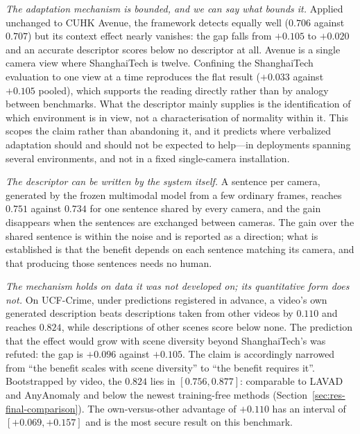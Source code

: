 \documentclass[a4paper,fleqn]{cas-sc}
\begin{document}
\emph{The adaptation mechanism is bounded, and we can say what bounds it.}
Applied unchanged to CUHK Avenue, the framework detects equally well ($0.706$
against $0.707$) but its context effect nearly vanishes: the gap falls from
$+0.105$ to $+0.020$ and an accurate descriptor scores below no descriptor at
all. Avenue is a single camera view where ShanghaiTech is twelve. Confining
the ShanghaiTech evaluation to one view at a time reproduces the flat result
($+0.033$ against $+0.105$ pooled), which supports the reading directly rather
than by analogy between benchmarks. What the descriptor mainly supplies is the
identification of which environment is in view, not a characterisation of
normality within it. This scopes the claim rather than abandoning it, and it
predicts where verbalized adaptation should and should not be expected to
help---in deployments spanning several environments, and not in a fixed
single-camera installation.

\emph{The descriptor can be written by the system itself.} A sentence per camera,
generated by the frozen multimodal model from a few ordinary frames, reaches
$0.751$ against $0.734$ for one sentence shared by every camera, and the gain
disappears when the sentences are exchanged between cameras. The gain over the
shared sentence is within the noise and is reported as a direction; what is
established is that the benefit depends on each sentence matching its camera,
and that producing those sentences needs no human.

\emph{The mechanism holds on data it was not developed on; its quantitative
form does not.} On UCF-Crime, under predictions registered in advance, a
video's own generated description beats descriptions taken from other videos by
$0.110$ and reaches $0.824$, while descriptions of other scenes score below none.
The prediction that the effect would grow with scene diversity beyond
ShanghaiTech's was refuted: the gap is $+0.096$ against $+0.105$. The claim is
accordingly narrowed from ``the benefit scales with scene diversity'' to ``the
benefit requires it''. Bootstrapped by video, the $0.824$ lies in
$[0.756, 0.877]$: comparable to LAVAD and AnyAnomaly and below the newest
training-free methods (Section~\ref{sec:res-final-comparison}). The
own-versus-other advantage of $+0.110$ has an interval of
$[+0.069, +0.157]$ and is the most secure result on this benchmark.
\end{document}
